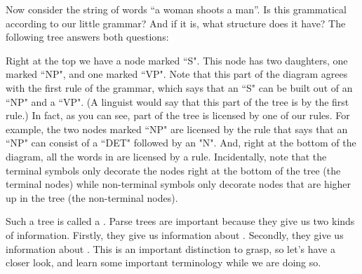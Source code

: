 Now consider the string of words ``a woman shoots a man''.  Is
this grammatical according to our little grammar?  And if it is, what
structure does it have?  The following tree answers both questions:

\begin{quote}
    { 
             {
                     {}
                     {}}
             {
                     {}
                     {
                             {}
                             {}}}}
\end{quote}



Right at the top we have a node marked ``S". This node has two
daughters, one marked ``NP", and one marked ``VP". Note that
this part of the diagram agrees with the first rule of the grammar,
which says that an ``S" can be built out of an ``NP" and a
``VP". (A linguist would say that this part of the tree is
 by the first rule.)  In fact, as you can see,
 part of the tree is licensed by one of our rules.  For
example, the two nodes marked ``NP" are licensed by the rule that
says that an ``NP" can consist of a ``DET" followed by an
"N". And, right at the bottom of the diagram, all the words in
 are licensed by a rule. Incidentally, note
that the terminal symbols only decorate the nodes right at the bottom
of the tree (the terminal nodes) while non-terminal symbols only
decorate nodes that are higher up in the tree (the non-terminal
nodes).

\clearpage
Such a tree is called a . Parse trees are important
because they give us two kinds of information.  Firstly, they give us
information about . Secondly, they give us information
about . This is an important distinction to grasp,
so let's have a closer look, and learn some important terminology
while we are doing so.

